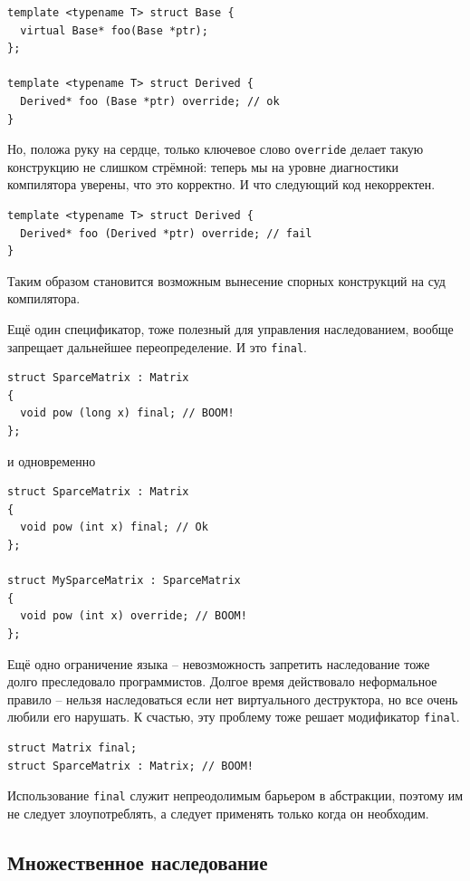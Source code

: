 \documentclass[a4paper,12pt,oneside]{article}
\begin{document}
\begin{lstlisting}
template <typename T> struct Base {
  virtual Base* foo(Base *ptr);
};

template <typename T> struct Derived {
  Derived* foo (Base *ptr) override; // ok
}
\end{lstlisting}

Но, положа руку на сердце, только ключевое слово \lstinline!override! делает такую конструкцию не слишком стрёмной: теперь мы на уровне диагностики компилятора уверены, что это корректно. И что следующий код некорректен.

\begin{lstlisting}
template <typename T> struct Derived {
  Derived* foo (Derived *ptr) override; // fail
}
\end{lstlisting}

Таким образом становится возможным вынесение спорных конструкций на суд компилятора.

Ещё один спецификатор, тоже полезный для управления наследованием, вообще запрещает дальнейшее переопределение. И это \lstinline!final!.

\begin{lstlisting}
struct SparceMatrix : Matrix
{
  void pow (long x) final; // BOOM!
};
\end{lstlisting}

и одновременно

\begin{lstlisting}
struct SparceMatrix : Matrix
{
  void pow (int x) final; // Ok
};

struct MySparceMatrix : SparceMatrix
{
  void pow (int x) override; // BOOM!
};
\end{lstlisting}

Ещё одно ограничение языка -- невозможность запретить наследование тоже долго преследовало программистов. Долгое время действовало неформальное правило -- нельзя наследоваться если нет виртуального деструктора, но все очень любили его нарушать. К счастью, эту проблему тоже решает модификатор \lstinline!final!.

\begin{lstlisting}
struct Matrix final;
struct SparceMatrix : Matrix; // BOOM!
\end{lstlisting}

Использование \lstinline!final! служит непреодолимым барьером в абстракции, поэтому им не следует злоупотреблять, а следует применять только когда он необходим.

\pagebreak
\subsection{Множественное наследование}\label{MultipleInheritance}
\end{document}
